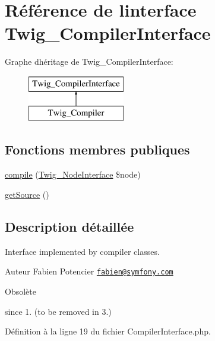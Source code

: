 \hypertarget{interface_twig___compiler_interface}{}\section{Référence de l\textquotesingle{}interface Twig\+\_\+\+Compiler\+Interface}
\label{interface_twig___compiler_interface}
Graphe d\textquotesingle{}héritage de Twig\+\_\+\+Compiler\+Interface\+:\begin{figure}[H]
\begin{center}
\leavevmode
\includegraphics[height=2.000000cm]{interface_twig___compiler_interface}
\end{center}
\end{figure}
\subsection*{Fonctions membres publiques}
\begin{DoxyCompactItemize}
\item 
\hyperlink{interface_twig___compiler_interface_a3f2ebfe4306bcd152c544085112319b5}{compile} (\hyperlink{interface_twig___node_interface}{Twig\+\_\+\+Node\+Interface} \$node)
\item 
\hyperlink{interface_twig___compiler_interface_a42fdd8313c99d9c5f80219c1e192b93a}{get\+Source} ()
\end{DoxyCompactItemize}


\subsection{Description détaillée}
Interface implemented by compiler classes.

\begin{DoxyAuthor}{Auteur}
Fabien Potencier \href{mailto:fabien@symfony.com}{\tt fabien@symfony.\+com}
\end{DoxyAuthor}
\begin{DoxyRefDesc}{Obsolète}
\item[\hyperlink{deprecated__deprecated000003}{Obsolète}]since 1. (to be removed in 3.) \end{DoxyRefDesc}


Définition à la ligne 19 du fichier Compiler\+Interface.\+php.



